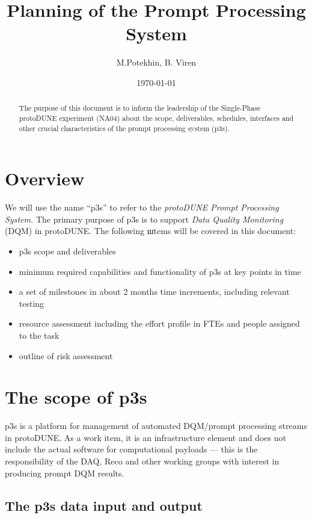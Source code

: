 \documentclass[pdftex,12pt,letter]{article}
\title{Planning of the \pd Prompt Processing System}
\date{\today}
\author{M.Potekhin, B. Viren}
\newcommand{\pd}{protoDUNE\xspace}
\begin{document}

\maketitle

\begin{abstract}
\noindent The purpose of this document is to inform the leadership
of the Single-Phase \pd experiment (NA04) about the scope, deliverables,
schedules, interfaces and other crucial characteristics of the prompt processing
system (p3s).
\end{abstract}


\pagebreak

\section{Overview}
We will use the name ``p3s'' to refer to the \textit{\pd Prompt Processing System.}
The primary purpose of p3s is to support \textit{Data Quality Monitoring} (DQM) in \pd.
The following шtems will be covered in this document:
\begin{itemize}
\item p3s scope and deliverables
\item minimum required capabilities and functionality of p3s at key points in time 

\item a set of milestones in about 2 months time increments, including relevant testing

\item resource assessment including the effort profile in FTEs and people assigned to the task

\item outline of risk assessment 
\end{itemize}


\section{The scope of p3s}
p3s is a platform for management of automated DQM/prompt processing streams
in \pd. As a work item, it is an infrastructure element and does not include the actual software for
computational payloads --- this is the responsibility of the DAQ, Reco and other working groups with interest in producing prompt DQM results.

\subsection{The p3s data input and output}
\label{sec:io}
\end{document}
